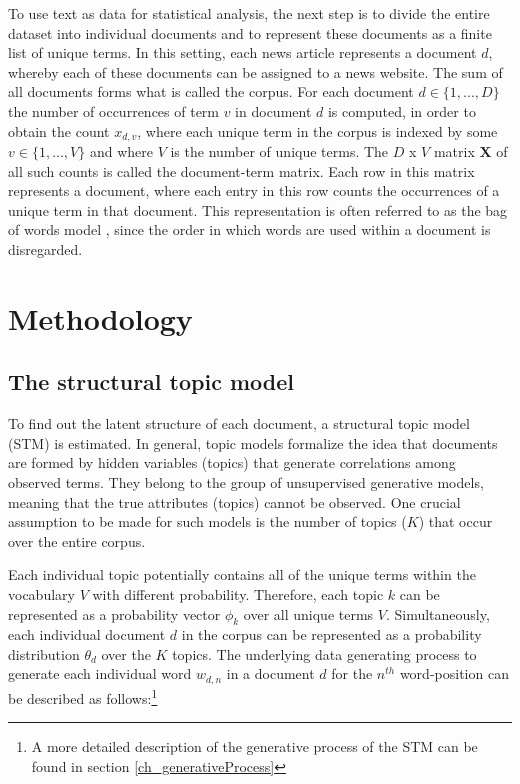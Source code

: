 \documentclass[12pt,a4paper,notitlepage]{article}
\begin{document}
To use text as data for statistical analysis, the next step is to divide the entire dataset into individual documents and to represent these documents as a finite list of unique terms. In this setting, each news article represents a document $d$, whereby each of these documents can be assigned to a news website. The sum of all documents forms what is called the corpus. For each document $d \in \lbrace 1,...,D \rbrace$ the number of occurrences of term $v$ in document $d$ is computed, in order to obtain the count $x_{d,v}$, where each unique term in the corpus is indexed by some $v \in \lbrace 1,...,V \rbrace$ and where $V$ is the number of unique terms. The $D$ x $V$ matrix $\boldsymbol{X}$ of all such counts is called the document-term matrix. Each row in this matrix represents a document, where each entry in this row counts the occurrences of a unique term in that document. This representation is often referred to as the bag of words model \citep{gentzkow_text_2017}, since the order in which words are used within a document is disregarded.
 

\section{Methodology}
\subsection{The structural topic model}\label{ch_model}

To find out the latent structure of each document, a structural topic model (STM) is estimated. In general, topic models formalize the idea that documents are formed by hidden variables (topics) that generate correlations among observed terms. They belong to the group of unsupervised generative models, meaning that the true attributes (topics) cannot be observed. One crucial assumption to be made for such models is the number of topics ($K$) that occur over the entire corpus. 

Each individual topic potentially contains all of the unique terms within the vocabulary $V$ with different probability. Therefore, each topic $k$ can be represented as a probability vector $\phi_k$ over all unique terms $V$. Simultaneously, each individual document $d$ in the corpus can be represented as a probability distribution $\theta_d$ over the $K$ topics. The underlying data generating process to generate each individual word $w_{d,n}$ in a document $d$ for the $n^{th}$ word-position can be described as follows:\footnote{A more detailed description of the generative process of the STM can be found in section \ref{ch_generativeProcess}}
\end{document}
